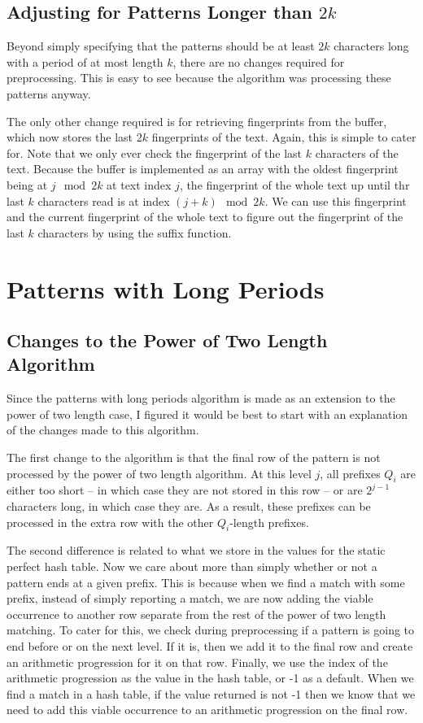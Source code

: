 \documentclass[ %
                    author={Dominic Joseph Moylett},
                    degree={MEng},
                     title={Dictionary Matching with Fingerprints},
                  subtitle={An Empirical Analysis},
                      type={research},
                      year={2015} ]{dissertation}
\begin{document}
\subsection{Adjusting for Patterns Longer than $2k$}

Beyond simply specifying that the patterns should be at least $2k$ characters long with a period of at most length $k$, there are no changes required for preprocessing. This is easy to see because the algorithm was processing these patterns anyway.

The only other change required is for retrieving fingerprints from the buffer, which now stores the last $2k$ fingerprints of the text. Again, this is simple to cater for. Note that we only ever check the fingerprint of the last $k$ characters of the text. Because the buffer is implemented as an array with the oldest fingerprint being at $j \mod 2k$ at text index $j$, the fingerprint of the whole text up until thr last $k$ characters read is at index $(j + k) \mod 2k$. We can use this fingerprint and the current fingerprint of the whole text to figure out the fingerprint of the last $k$ characters by using the suffix function.

\section{Patterns with Long Periods}
\label{sec:impl-long}

\subsection{Changes to the Power of Two Length Algorithm}

Since the patterns with long periods algorithm is made as an extension to the power of two length case, I figured it would be best to start with an explanation of the changes made to this algorithm.

The first change to the algorithm is that the final row of the pattern is not processed by the power of two length algorithm. At this level $j$, all prefixes $Q_i$ are either too short -- in which case they are not stored in this row -- or are $2^{j - 1}$ characters long, in which case they are. As a result, these prefixes can be processed in the extra row with the other $Q_i$-length prefixes.

The second difference is related to what we store in the values for the static perfect hash table. Now we care about more than simply whether or not a pattern ends at a given prefix. This is because when we find a match with some prefix, instead of simply reporting a match, we are now adding the viable occurrence to another row separate from the rest of the power of two length matching. To cater for this, we check during preprocessing if a pattern is going to end before or on the next level. If it is, then we add it to the final row and create an arithmetic progression for it on that row. Finally, we use the index of the arithmetic progression as the value in the hash table, or -1 as a default. When we find a match in a hash table, if the value returned is not -1 then we know that we need to add this viable occurrence to an arithmetic progression on the final row.
\end{document}
